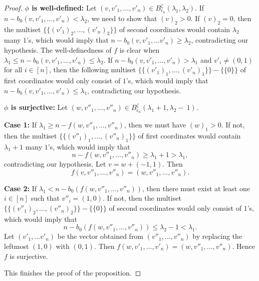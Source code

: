 \documentclass[12pt,reqno]{amsart}
\theoremstyle{definition}
\theoremstyle{remark}
\begin{document}
\begin{proof}
\textbf{$\phi$ is well-defined:} Let $(v,v'_{1},\dotsc, v'_{n})\in B^{\zeta}_{\epsilon_{n}}(\lambda_{1},\lambda_{2})$. If $n- b_{0}(v,v'_{1},\dotsc, v'_{n})< \lambda_{2}$, we need to show that $(v)_{2}>0$. If $(v)_{2}=0$, then the multiset $\{\{(v'_{1})_{2},\dotsc, (v'_{n})_{2}\}\}$ of second coordinates would contain $\lambda_{2}$ many $1$'s, which would imply that $n- b_{0}(v,v'_{1},\dotsc v'_{n})\geq \lambda_{2}$, contradicting our hypothesis. The well-definedness of $f$ is clear when $\lambda_{1}\leq n- b_{0}(v,v'_{1},\dotsc, v'_{n})\leq \lambda_{2}$.
If $n- b_{0}(v,v'_{1},\dotsc, v'_{n})>\lambda_{1}$ and $v'_{i}\neq (0,1)$ for all $i\in[n]$, then the following multiset $\{\{(v'_{1})_{1},\dotsc,(v'_{n})_{1}\}\}-\{\{0\}\}$ of first coordinates would only consist of $1$'s, which would imply that $n-b_{0}(v,v'_{1},\dotsc, v'_{n})\leq \lambda_{1}$, contradicting our hypothesis. 


\textbf{$\phi$ is surjective:} Let $(w,v''_{1},\dotsc, v''_{n})\in B^{\zeta}_{\epsilon_{n}}(\lambda_{1}+1,\lambda_{2}-~1)$. 

\textbf{Case 1:} If $\lambda_{1}\geq n-f(w,v''_{1},\dotsc, v''_{n})$, then we must have $(w)_{1}>0$. If not, then the multiset $\{\{(v''_{1})_{1},\dotsc, (v''_{n})_{1}\}\}$ of first coordinates would contain $\lambda_{1}+1$ many $1$'s, which would imply that 
$$n-f(w,v''_{1},\dotsc, v''_{n})\geq \lambda_{1}+1>\lambda_{1},$$ contradicting our hypothesis. Let $v=w+(-1,1)$. Then $$f(v,v''_{1},\dotsc, v''_{n})=(w,v''_{1},\dotsc, v''_{n}).$$ 

\textbf{Case 2:} If $\lambda_{1}< n-b_{0}(f(w,v''_{1},\dotsc, v''_{n}))$, then there must exist at least one $i\in[n]$ such that $v''_{i}=(1,0)$. If not, then the multiset $\{\{(v''_{1})_{2},\dotsc, (v''_{n})_{2}\}\}-\{\{0\}\}$ of second coordinates would only consist of $1$'s, which would imply that
$$n-b_{0}(f(w,v''_{1},\dotsc, v''_{n}))\leq \lambda_{2}-1<\lambda_{1}.$$ Let $(v'_{1},\dotsc v'_{n})$ be the vector obtained from $(v''_{1},\dotsc, v''_{n})$ by replacing the leftmost $(1,0)$ with $(0,1)$. Then $f(w, v'_{1},\dotsc, v'_{n})=(w,v''_{1},\dotsc, v''_{n})$. Hence $f$ is surjective.

This finishes the proof of the proposition.
\end{proof}
\end{document}
